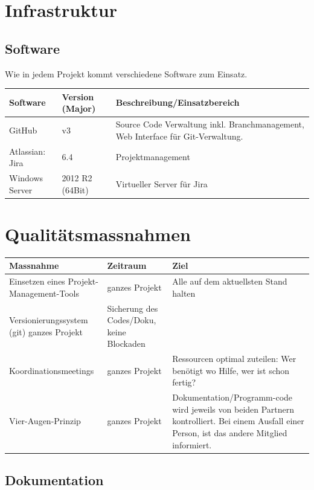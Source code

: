 \section*{Infrastruktur}
	\subsection*{Software}
		Wie in jedem Projekt kommt verschiedene Software zum Einsatz. \\

	\begin{tabularx}{\textwidth}{llX}
		\textbf{Software} & \textbf{Version (Major)} & \textbf{Beschreibung/Einsatzbereich}
		\\ \hline
			GitHub	&
			v3 &
			Source Code Verwaltung inkl. Branchmanagement, Web Interface für Git-Verwaltung.
		\\ \hline
			Atlassian: Jira &
			6.4 &
			Projektmanagement
		\\ \hline
			Windows Server &
			2012 R2 (64Bit) &
			Virtueller Server für Jira
		\\ \hline
	\end{tabularx}
\pagebreak

\section*{Qualitätsmassnahmen}
	\begin{tabularx}{\textwidth}{XXX}
		\textbf{Massnahme} & \textbf{Zeitraum} & \textbf{Ziel}
		\\ \hline
			Einsetzen eines Projekt-Management-Tools &
			ganzes Projekt &
			Alle auf dem aktuellsten Stand halten
		\\ \hline
			Versionierungssystem (git) ganzes Projekt &
			Sicherung des Codes/Doku, keine Blockaden
		\\ \hline
			Koordinationsmeetings &
			ganzes Projekt &
			Ressourcen optimal zuteilen: Wer benötigt wo Hilfe, wer ist schon fertig?
		\\ \hline
			Vier-Augen-Prinzip &
			ganzes Projekt &
			Dokumentation/Programm-code wird jeweils von beiden Partnern kontrolliert. Bei einem Ausfall einer Person, ist das andere Mitglied informiert.
		\\ \hline
	\end{tabularx}

	\subsection*{Dokumentation}
